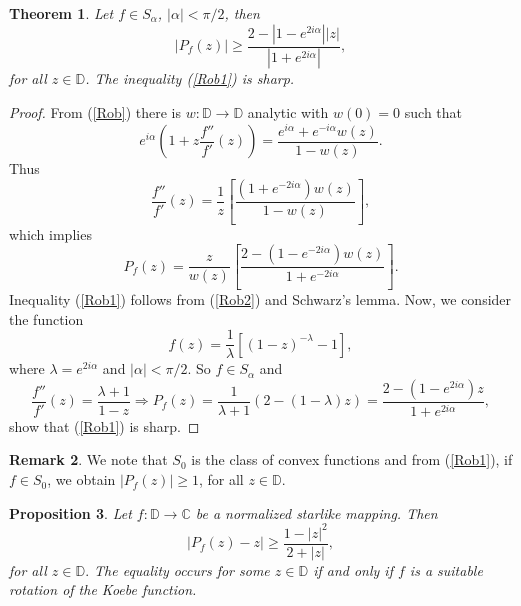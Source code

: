 \documentclass[reqno]{amsart}
\theoremstyle{plain}
\newtheorem{theo}{Theorem}[section]
\newtheorem{prop}[theo]{Proposition}
\theoremstyle{definition}
\newtheorem{rem}[theo]{Remark}
\newcommand{\C}{\mathbb{C}}
\newcommand{\D}{\mathbb{D}}
\begin{document}
\begin{theo}
    Let $f\in S_{\alpha}$, $|\alpha|<\pi/2$, then 
\begin{equation}\label{Rob1}
|P_f(z)|\geq \frac{2-|1-e^{2i\alpha}||z|}{|1+e^{2i\alpha}|},   
\end{equation}
for all $z\in \D$. The inequality (\ref{Rob1}) is sharp.
\end{theo}

\begin{proof}
From (\ref{Rob}) there is $w:\D \to \D$ analytic with $w(0)=0$ such that
\[e^{i\alpha}\left(1+z\frac{f''}{f'}(z)\right) =\frac{ e^{i\alpha}+ e^{-i\alpha}w(z)}{1-w(z)}.\]
Thus
\[\frac{f''}{f'}(z)=\frac{1}{z}\left[\frac{(1+e^{-2i\alpha})w(z)}{1-w(z)}\right],\]
which implies
\begin{equation} \label{Rob2}
   P_f(z)=\frac{z}{w(z)}\left[\frac{2-(1-e^{-2i\alpha})w(z)}{1+e^{-2i\alpha}}\right]. 
\end{equation}
Inequality (\ref{Rob1}) follows from (\ref{Rob2}) and Schwarz's lemma. Now, we consider the function
\[f(z)=\frac{1}{\lambda}\left[(1-z)^{-\lambda}-1\right],\]
where $\lambda=e^{2i\alpha}$ and $|\alpha|<\pi/2.$ So $f\in S_{\alpha}$ and
\[\frac{f''}{f'}(z)=\frac{\lambda +1}{1-z} \Rightarrow P_f(z)= \frac{1}{\lambda+1}(2-(1-\lambda)z)=\frac{2-(1-e^{2i\alpha})z}{1+e^{2i\alpha}},\]
show that (\ref{Rob1}) is sharp.
\end{proof}

\begin{rem}
We note that $S_0$ is the class of convex functions and from (\ref{Rob1}), if $f\in S_0$, we obtain $|P_f(z)|\geq 1$, for all $z\in \D$.
\end{rem}

\begin{prop}\label{Starlike}
 Let $f:\D\to\C$ be a normalized starlike mapping. Then 
 \begin{equation}\label{Prstarlike}
  |P_f(z)-z|\geq \dfrac{1-|z|^2}{2+|z|},   
 \end{equation}
 for all $z\in\D.$ The equality occurs for some $z\in\D$ if and only if $f$ is a suitable rotation of the Koebe function.    
\end{prop}
\end{document}
